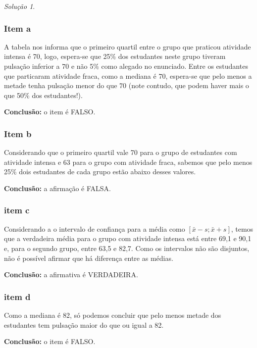 \documentclass[
]{latex/krantz}
\theoremstyle{definition}
\theoremstyle{definition}
\theoremstyle{definition}
\theoremstyle{definition}
\theoremstyle{remark}
\newtheorem*{solution}{Solução}
\begin{document}
\begin{solution}
\leavevmode

\hypertarget{item-a}{%
\subsubsection*{Item a}\label{item-a}}

A tabela nos informa que o primeiro quartil entre o grupo que praticou atividade intensa é 70, logo, espera-se que 25\% dos estudantes neste grupo tiveram pulsação inferior a 70 e não 5\% como alegado no enunciado.
Entre os estudantes que particaram atividade fraca, como a mediana é 70, espera-se que pelo menos a metade tenha pulsação menor do que 70 (note contudo, que podem haver mais o que 50\% dos estudantes!).

\textbf{Conclusão:} o item é FALSO.

\hypertarget{item-b}{%
\subsubsection*{Item b}\label{item-b}}

Considerando que o primeiro quartil vale 70 para o grupo de estudantes com atividade intensa e 63 para o grupo com atividade fraca, sabemos que pelo menos 25\% dois estudantes de cada grupo estão abaixo desses valores.

\textbf{Conclusão:} a afirmação é FALSA.

\hypertarget{item-c}{%
\subsubsection*{item c}\label{item-c}}

Considerando a o intervalo de confiança para a média como \([\bar{x} - s; \bar{x} + s]\), temos que a verdadeira média para o grupo com atividade intensa está entre 69,1 e 90,1 e, para o segundo grupo, entre 63,5 e 82,7. Como os intervalos não são disjuntos, não é possível afirmar que há diferença entre as médias.

\textbf{Conclusão:} a afirmativa é VERDADEIRA.

\hypertarget{item-d}{%
\subsubsection*{item d}\label{item-d}}

Como a mediana é 82, só podemos concluir que pelo menos metade dos estudantes tem pulsação maior do que ou igual a 82.

\textbf{Conclusão:} o item é FALSO.

\end{solution}
\end{document}
